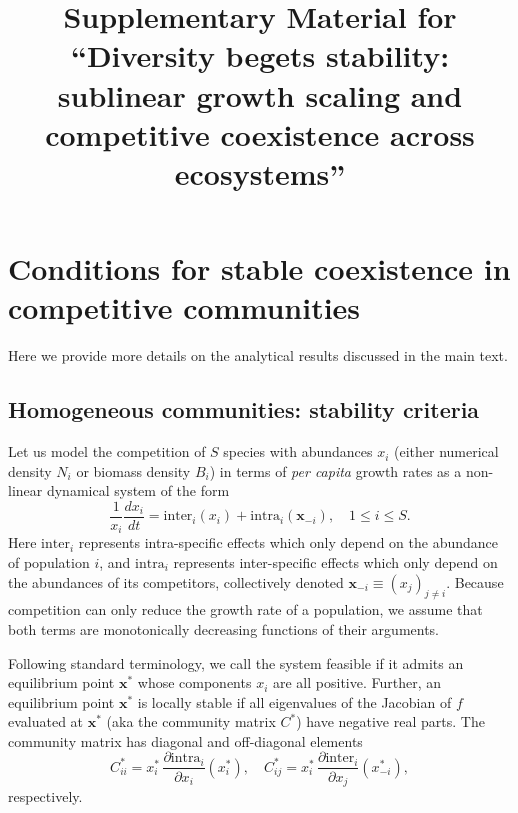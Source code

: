 \documentclass[12pt]{article}
\title{Supplementary Material for ``Diversity begets stability: sublinear growth scaling and competitive coexistence across ecosystems''}
\newcommand{\inter}{\textrm{inter}}
\newcommand{\intra}{\textrm{intra}}
\begin{document}
\appendix

\maketitle




\section{Conditions for stable coexistence in competitive communities}

Here we provide more details on the analytical results discussed in the main text. 

\subsection{Homogeneous communities: stability criteria}


Let us model the competition of $S$ species with abundances $x_i$ (either numerical density $N_i$ or biomass density $B_i$) in terms of \emph{per capita} growth rates as a non-linear dynamical system of the form
\begin{equation}
\frac{1}{x_i}\frac{dx_i}{dt} = \inter_i(x_i) + \intra_i(\mathbf x_{-i}), \quad 1\leq i\leq S .
\end{equation}
Here $\inter_i$ represents intra-specific effects which only depend on the abundance of population $i$, and  $\intra_i$ represents inter-specific effects which only depend on the abundances of its competitors, collectively denoted $\mathbf x_{-i}\equiv (x_j)_{j \neq i}$. Because competition can only reduce the growth rate of a population, we assume that both terms are monotonically decreasing functions of their arguments. 

Following standard terminology, we call the system feasible if it admits an equilibrium point $\mathbf x^*$ whose components $x_i$ are all positive. Further, an equilibrium point $\mathbf x^*$ is locally stable if all eigenvalues of the Jacobian of $f$ evaluated at $\mathbf x^*$ (aka the community matrix $C^*$) have negative real parts. 
The community matrix has diagonal and off-diagonal elements 
\begin{equation}
    C^*_{ii} = x_i^*\, \frac{\partial \intra_i}{\partial x_i}(x_i^*), \quad C^*_{ij} = x_i^*\, \frac{\partial \inter_i}{\partial x_j}(x_{-i}^*),
\end{equation}
respectively. 
\end{document}

